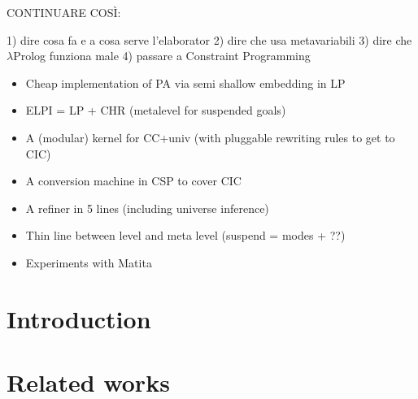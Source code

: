 \documentclass{easychair}
\begin{document}
CONTINUARE COSÌ:

1) dire cosa fa e a cosa serve l'elaborator
2) dire che usa metavariabili
3) dire che $\lambda$Prolog funziona male
4) passare a Constraint Programming

\begin{itemize}
\item Cheap implementation of PA via semi shallow embedding in LP
\item ELPI = LP + CHR (metalevel for suspended goals)
\item A (modular) kernel for CC+univ (with pluggable rewriting rules to get to CIC)
\item A conversion machine in CSP to cover CIC
\item A refiner in 5 lines (including universe inference)
\item Thin line between level and meta level (suspend = modes + ??)
\item Experiments with Matita
\end{itemize}


\section{Introduction}

\section{Related works}

\label{sect:bib}


\end{document}
